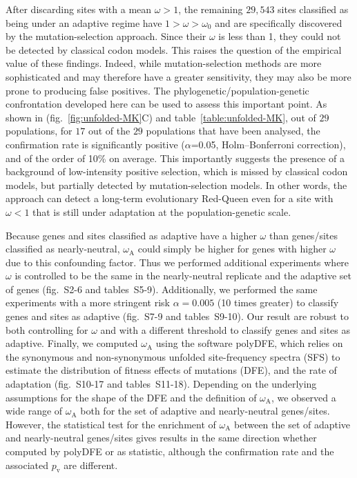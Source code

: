 \documentclass{article}
\newcommand{\rateApop}{\omega_{\mathrm{A}}}
\begin{document}
    After discarding sites with a mean $\omega > 1$, the remaining $29,543$ sites classified as being under an adaptive regime have $1 > \omega > \omega_{0}$ and are specifically discovered by the mutation-selection approach.
    Since their $\omega$ is less than 1, they could not be detected by classical codon models.
    This raises the question of the empirical value of these findings.
    Indeed, while mutation-selection methods are more sophisticated and may therefore have a greater sensitivity, they may also be more prone to producing false positives.
    The phylogenetic/population-genetic confrontation developed here can be used to assess this important point.
    As shown in (fig.~\ref{fig:unfolded-MK}C) and table~\ref{table:unfolded-MK}, out of $29$ populations, for $17$ out of the $29$ populations that have been analysed, the confirmation rate is significantly positive ($\alpha$=0.05, Holm–Bonferroni correction), and of the order of 10\% on average.
    This importantly suggests the presence of a background of low-intensity positive selection, which is missed by classical codon models, but partially detected by mutation-selection models.
    In other words, the approach can detect a long-term evolutionary Red-Queen even for a site with $\omega < 1$ that is still under adaptation at the population-genetic scale.

    Because genes and sites classified as adaptive have a higher $\omega$ than genes/sites classified as nearly-neutral, $\rateApop$ could simply be higher for genes with higher $\omega$ due to this confounding factor.
    Thus we performed additional experiments where $\omega$ is controlled to be the same in the nearly-neutral replicate and the adaptive set of genes (fig.~S2-6 and tables~S5-9).
    Additionally, we performed the same experiments with a more stringent risk $\alpha=0.005$ (10 times greater) to classify genes and sites as adaptive (fig.~S7-9 and tables~S9-10).
    Our result are robust to both controlling for $\omega$ and with a different threshold to classify genes and sites as adaptive.
    Finally, we computed $\rateApop$ using the software polyDFE\cite{tataru_polydfe_2020}, which relies on the synonymous and non-synonymous unfolded site-frequency spectra (SFS) to estimate the distribution of fitness effects of mutations (DFE), and the rate of adaptation (fig.~S10-17 and tables~S11-18).
    Depending on the underlying assumptions for the shape of the DFE and the definition of $\rateApop$, we observed a wide range of $\rateApop$ both for the set of adaptive and nearly-neutral genes/sites.
    However, the statistical test for the enrichment of $\rateApop$ between the set of adaptive and nearly-neutral genes/sites gives results in the same direction whether computed by polyDFE or as \textcite{mcdonald_adaptative_1991} statistic, although the confirmation rate and the associated $p_{\mathrm{v}}$ are different.
\end{document}

